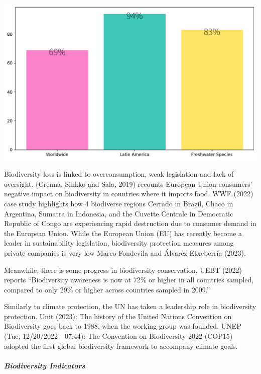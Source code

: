 \documentclass[
  letterpaper,
  DIV=11,
  numbers=noendperiod]{scrartcl}
\makeatletter
\let\oldparagraph\paragraph
\renewcommand{\paragraph}{
    \@ifstar
      \xxxParagraphStar
      \xxxParagraphNoStar
  }
\newcommand{\xxxParagraphStar}[1]{\oldparagraph*{#1}\mbox{}}
\newcommand{\xxxParagraphNoStar}[1]{\oldparagraph{#1}\mbox{}}
\makeatother
\begin{document}
\includegraphics{sustainability_files/figure-pdf/cell-2-output-1.pdf}

Biodiversity loss is linked to overconsumption, weak legislation and
lack of oversight. (Crenna, Sinkko and Sala, 2019) recounts European
Union consumers' negative impact on biodiversity in countries where it
imports food. WWF (2022) case study highlights how 4 biodiverse regions
Cerrado in Brazil, Chaco in Argentina, Sumatra in Indonesia, and the
Cuvette Centrale in Democratic Republic of Congo are experiencing rapid
destruction due to consumer demand in the European Union. While the
European Union (EU) has recently become a leader in sustainability
legislation, biodiversity protection measures among private companies is
very low Marco-Fondevila and Álvarez-Etxeberría (2023).

Meanwhile, there is some progress in biodiversity conservation. UEBT
(2022) reports ``Biodiversity awareness is now at 72\% or higher in all
countries sampled, compared to only 29\% or higher across countries
sampled in 2009.''

Similarly to climate protection, the UN has taken a leadership role in
biodiversity protection. Unit (2023): The history of the United Nations
Convention on Biodiversity goes back to 1988, when the working group was
founded. UNEP (Tue, 12/20/2022 - 07:44): The Convention on Biodiversity
2022 (COP15) adopted the first global biodiversity framework to
accompany climate goals.

\paragraph{\texorpdfstring{\textbf{\emph{Biodiversity
Indicators}}}{Biodiversity Indicators}}\label{biodiversity-indicators}
\end{document}
